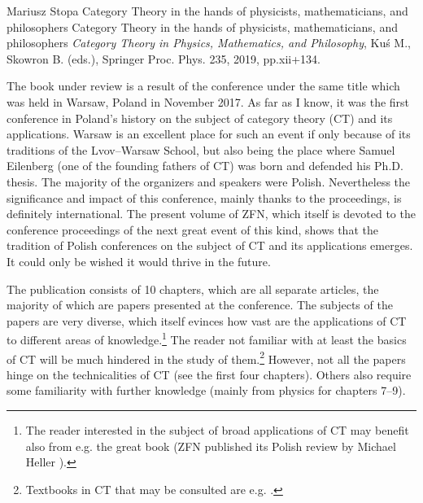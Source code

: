 \begin{recengenv}{Mariusz Stopa}
	{Category Theory in the hands of physicists, mathematicians, and philosophers}
	{Category Theory in the hands of physicists, mathematicians, and philosophers}
	{\textit{Category Theory in Physics, Mathematics, and Philosophy}, Kuś M., Skowron B. (eds.), Springer Proc. Phys. 235, 2019, pp.xii+134.}

The book under review is a result of the conference under the same title which was held in Warsaw, Poland in November 2017. As far as I know, it was the first conference in Poland's history on the subject of cat\-e\-go\-ry theory (CT) and its applications. Warsaw is an excellent place for such an event if only because of its traditions of the Lvov–Warsaw School, but also being the place where Samuel Eilenberg (one of the founding fathers of CT) was born and defended his Ph.D. thesis. The majority of the organizers and speakers were Polish. Nevertheless the significance and impact of this conference, mainly thanks to the proceedings, is definitely international. The present volume of ZFN, which itself is devoted to the conference proceedings of the next great event of this kind, shows that the tradition of Polish conferences on the subject of CT and its applications emerges. It could only be wished it would thrive in the future.

The publication consists of 10 chapters, which are all separate articles, the majority of which are papers presented at the conference. The subjects of the papers are very diverse, which itself evinces how vast are the applications of CT to different areas of knowledge.\footnote{The reader interested in the subject of broad applications of CT may benefit also from e.g. the great book \parencite{awodey_category_2010} (ZFN published its Polish review by Michael Heller \parencite*{heller_filozoficznie_2018}).} The reader not familiar with at least the basics of CT will be much hindered in the study of them.\footnote{Textbooks in CT that may be consulted are e.g. \parencite{awodey_category_2010, smith_category_2018, mclarty_elementary_1995}.} However, not all the papers hinge on the technicalities of CT (see the first four chapters). Others also require some familiarity with further knowledge (mainly from physics for chapters 7--9). 


\end{recengenv}
